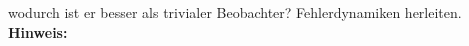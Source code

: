 \begin{question}[section=8,name={Luenberger Beobachter 2},difficulty=,type=mdl,tags={}]
	wodurch ist er besser als trivialer Beobachter? Fehlerdynamiken herleiten.
	\\ \textbf{Hinweis:}\\
	
\end{question}
\begin{solution}
	
\end{solution}